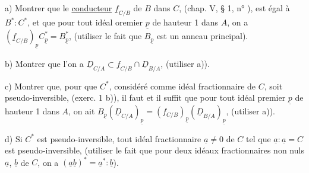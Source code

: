 a) Montrer que le \uline{conducteur} $\underline f_{C/B}$ de $B$ dans $C$, (chap. V, \S{} 1, n° \quad), est égal à $B^*:C^*$, et que pour tout idéal oremier $\underline p$ de hauteur 1 dans $A$, on a $(\underline f_{C/B})_{\underline p}C^*_{\underline p}=B^*_{\underline p}$, (utiliser le fait que $B_{\underline p}$ est un anneau principal).

b) Montrer que l'on a $\underline D_{C/A}\subset\underline f_{C/B}\cap\underline D_{B/A}$, (utiliser a)).

c) Montrer que, pour que $C^*$, considéré comme idéal fractionnaire de $C$, soit pseudo-inversible, (exerc. 1 b)), il faut et il suffit que pour tout idéal premier $\underline p$ de hauteur 1 dans $A$, on ait $B_{\underline p}(\underline D_{C/A})_{\underline p}=(f_{C/B})_{\underline p}(\underline D_{B/A})_{\underline p}$, (utiliser a)).

d) Si $C^*$ est pseudo-inversible, tout idéal fractionnaire $\underline a\ne0$ de $C$ tel que $\underline a:\underline a=C$ est pseudo-inversible, (utiliser le fait que pour deux idéaux fractionnaires non nuls $\underline a$, $\underline b$ de $C$, on a $(\underline a\underline b)^*=\underline a^*:\underline b$).
